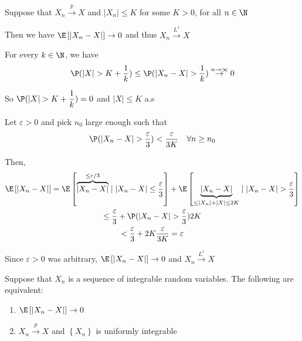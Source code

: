 \par\bigskip
\begin{theo}[]{}
  Suppose that $X_n\stackrel{p}{\to}X$ and $\left|X_n\right|\leq K$ for some $K>0$, for all $n\in\N$
  \par\bigskip
  \noindent Then we have $\E\left[\left|X_n-X\right|\right]\to0$ and thus $X_n\stackrel{L^1}{\to}X$
\end{theo}
\par\bigskip
\begin{prf}[]{}
  For every $k\in\N$, we have
  \begin{equation*}
    \begin{gathered}
      \P(\left|X\right|>K+\dfrac{1}{k})\leq\P(\left|X_n-X\right|>\dfrac{1}{k})\stackrel{n\to\infty}{\to}0
    \end{gathered}
  \end{equation*}\par
  \noindent So $\P(\left|X\right|>K+\dfrac{1}{k})=0$ and $\left|X\right|\leq K$ a.s
  \par\bigskip
  \noindent Let $\varepsilon>0$ and pick $n_0$ large enough such that
  \begin{equation*}
    \begin{gathered}
      \P(\left|X_n-X\right|>\dfrac{\varepsilon}{3})<\dfrac{\varepsilon}{3K}\quad\forall n\geq n_0
    \end{gathered}
  \end{equation*}\par
  \noindent Then,
  \begin{equation*}
    \begin{gathered}
      \E\left[\left|X_n-X\right|\right] = \E\left[\overbrace{\left|X_n-X\right|}^{\leq \varepsilon/3}\mid\left|X_n-X\right|\leq \dfrac{\varepsilon}{3}\right] + \E\left[\underbrace{\left|X_n-X\right|}_{\substack{\leq \left|X_n\right|+\left|X\right|\leq 2K}}\mid \left|X_n-X\right|>\dfrac{\varepsilon}{3}\right]\\
      \leq \dfrac{\varepsilon}{3}+\P(\left|X_n-X\right|>\dfrac{\varepsilon}{3})2K\\
      < \dfrac{\varepsilon}{3}+2K\dfrac{\varepsilon}{3K} = \varepsilon
    \end{gathered}
  \end{equation*}
  \par\bigskip
  \noindent Since $\varepsilon>0$ was arbitrary, $\E\left[\left|X_n-X\right|\right]\to0$ and $X_n\stackrel{L^1}{\to} X$
\end{prf}
\par\bigskip
\begin{theo}[]{}
  Suppose that $X_n$ is a sequence of integrable random variables. The following are equivalent:\par
  \begin{enumerate}[leftmargin=*]
    \item $\E\left[\left|X_n-X\right|\right]\to0$
  \item $X_n\stackrel{p}{\to}X$ and $\left\{X_n\right\}$ is uniformly integrable
  \end{enumerate}
\end{theo}
\par\bigskip
